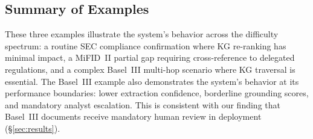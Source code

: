 \documentclass[11pt]{article}
\begin{document}
\subsection{Summary of Examples}

These three examples illustrate the system's behavior across the difficulty spectrum: a routine SEC compliance confirmation where KG re-ranking has minimal impact, a MiFID~II partial gap requiring cross-reference to delegated regulations, and a complex Basel~III multi-hop scenario where KG traversal is essential. The Basel~III example also demonstrates the system's behavior at its performance boundaries: lower extraction confidence, borderline grounding scores, and mandatory analyst escalation. This is consistent with our finding that Basel~III documents receive mandatory human review in deployment (\S\ref{sec:results}).
\end{document}

